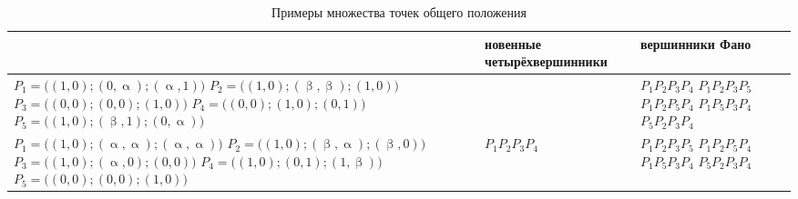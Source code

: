 \begin{table}[]
\caption{Примеры множества точек общего положения}
\label{tab:my-table}
\begin{center}
\begin{tabular}{m{4.5cm}m{2.7cm}m{2.7cm}}
  \toprule
\parbox[c][][c]{0.3\textwidth}{ } & \parbox[c][][c]{0.2\textwidth}{ \-но\-вен\-ные четырёх\-вершинники} & \parbox[c][][c]{0.2\textwidth}{ \-вершинники Фано} \\
\midrule
$P_1 = \bigl((1,0);(0,\upalpha);(\upalpha,1)\bigr)$\newline
                $P_2 = \bigl((1,0);(\upbeta,\upbeta);(1,0)\bigr)$\newline
                $P_3 = \bigl((0,0);(0,0);(1,0)\bigr)$\newline
                $P_4 = \bigl((0,0);(1,0);(0,1)\bigr)$\newline
                $P_5 = \bigl((1,0);(\upbeta,1);(0,\upalpha)\bigr)$
      &
      &            $P_1P_2P_3P_4$ \newline
                      $P_1P_2P_3P_5$\newline
                        $P_1P_2P_5P_4$\newline
                        $P_1P_5P_3P_4$\newline
                        $P_5P_2P_3P_4$             \\
\midrule

$P_1 = \bigl((1,0);(\upalpha,\upalpha);(\upalpha,\upalpha)\bigr)$\newline
$P_2 = \bigl((1,0);(\upbeta,\upalpha);(\upbeta,0)\bigr)$\newline
$P_3 = \bigl((1,0);(\upalpha,0);(0,0)\bigr)$\newline
$P_4 = \bigl((1,0);(0,1);(1,\upbeta)\bigr)$\newline
$P_5 = \bigl((0,0);(0,0);(1,0)\bigr)$     &
            $P_1P_2P_3P_4$                   &
                              $P_1P_2P_3P_5$\newline
                              $P_1P_2P_5P_4$\newline
                              $P_1P_5P_3P_4$\newline
                              $P_5P_2P_3P_4$                 \\


\end{tabular}
\end{center}
\end{table}
